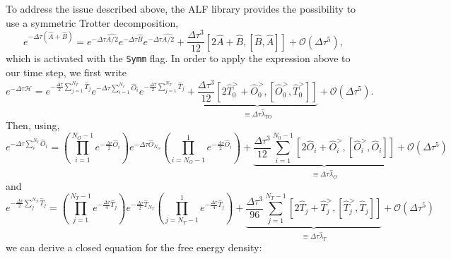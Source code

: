 To address the issue described above, the ALF library provides the possibility to use a symmetric Trotter decomposition, 
\begin{equation}
	e^{ -\Delta \tau \left( \hat{A} + \hat{B} \right)  }  =  e^{ -\Delta \tau \hat{A/2}}  e^{ -\Delta \tau  \hat{B}  }   e^{ -\Delta \tau \hat{A/2}}  +  \frac{\Delta  \tau^3}{12} \left[ 2\hat{A} + \hat{B}, \left[\hat{B}, \hat{A} \right]\right] + \mathcal{O} \left (\Delta \tau ^5 \right)  ,
\end{equation}
which is activated with the \texttt{Symm}  flag.
In order to apply the expression above to our time step, we first write
\begin{equation}
	e^{-\Delta \tau \mathcal{H}}    =       e^{-\frac{\Delta \tau}{2} \sum_{j=1}^{N_T} \hat{T}_j } e^{-\Delta \tau \sum_{i=1}^{N_I} \hat{O}_i } e^{-\frac{\Delta \tau}{2} \sum_{j=1}^{N_T} \hat{T}_j }   
	 +  \underbrace{\frac{\Delta \tau ^3}{12}   \left[ 2\hat{T}^{>}_0 + \hat{O}^{>}_0, \left[\hat{O}^{>}_{0}, \hat{T}^{>}_0 \right]\right] }_{\equiv \Delta \tau \hat{\lambda}_{TO}}   + \mathcal{O}\left(  \Delta \tau^5 \right).
\end{equation}
Then, using,
\begin{equation}
 e^{-\Delta \tau \sum_{i}^{N_I} \hat{O}_i }  =  \left(\prod_{i=1}^{N_O-1} e^{-\frac{\Delta \tau}{2} \hat{O}_i } \right)    e^{-\Delta \tau \hat{O}_{N_O} }    
   \left(  \prod_{i=N_O-1}^{1} e^{-\frac{\Delta \tau}{2} \hat{O}_i } \right)   + 
  \underbrace{\frac{\Delta \tau ^3}{12}  \sum_{i=1}^{N_0-1} \left[ 2\hat{O}_i + \hat{O}^{>}_i, \left[\hat{O}^{>}_{i}, \hat{O}_i \right]\right] }_{\equiv \Delta \tau \hat{\lambda}_{O}}    + \mathcal{O}\left(  \Delta  \tau^5 \right) 
\end{equation}
and 
\begin{equation}
 e^{- \frac{\Delta \tau}{2} \sum_{j}^{N_T} \hat{T}_j }  =  \left(\prod_{j=1}^{N_T-1} e^{-\frac{\Delta \tau}{4} \hat{T}_j } \right)    e^{-\frac{\Delta \tau}{2} \hat{T}_{N_T} }    
   \left(  \prod_{j=N_T-1}^{1} e^{-\frac{\Delta \tau}{4} \hat{T}_j } \right)   + 
  \underbrace{\frac{\Delta \tau ^3}{96}  \sum_{j=1}^{N_T-1} \left[ 2\hat{T}_j + \hat{T}^{>}_j, \left[\hat{T}^{>}_{j}, \hat{T}_j \right]\right] }_{\equiv \Delta \tau \hat{\lambda}_{T}}    + \mathcal{O}\left(  \Delta  \tau^5 \right) 
\end{equation}
we can derive  a  closed equation  for  the free energy density:
